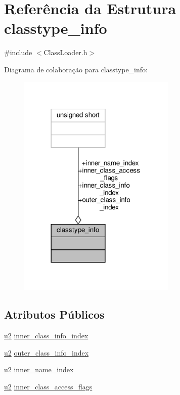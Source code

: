 \hypertarget{structclasstype__info}{}\section{Referência da Estrutura classtype\+\_\+info}
\label{structclasstype__info}


{\ttfamily \#include $<$Class\+Loader.\+h$>$}



Diagrama de colaboração para classtype\+\_\+info\+:\nopagebreak
\begin{figure}[H]
\begin{center}
\leavevmode
\includegraphics[width=213pt]{structclasstype__info__coll__graph}
\end{center}
\end{figure}
\subsection*{Atributos Públicos}
\begin{DoxyCompactItemize}
\item 
\hyperlink{ClassLoader_8h_a5f223212eef04d10a4550ded680cb1cf}{u2} \hyperlink{structclasstype__info_a3d095ea8d63dca94b9feb3a365b1f52e}{inner\+\_\+class\+\_\+info\+\_\+index}
\item 
\hyperlink{ClassLoader_8h_a5f223212eef04d10a4550ded680cb1cf}{u2} \hyperlink{structclasstype__info_addb19ba72e3ccfc7b7e5630b872e87f1}{outer\+\_\+class\+\_\+info\+\_\+index}
\item 
\hyperlink{ClassLoader_8h_a5f223212eef04d10a4550ded680cb1cf}{u2} \hyperlink{structclasstype__info_a55194f64ad8da0051fd2457811852eda}{inner\+\_\+name\+\_\+index}
\item 
\hyperlink{ClassLoader_8h_a5f223212eef04d10a4550ded680cb1cf}{u2} \hyperlink{structclasstype__info_a2e4834ba45e2650aa080837472e9afc4}{inner\+\_\+class\+\_\+access\+\_\+flags}
\end{DoxyCompactItemize}


